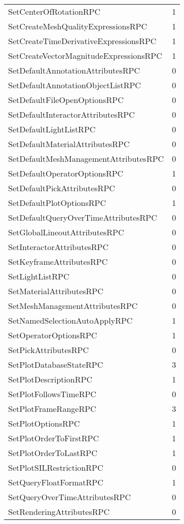 \documentclass[10pt,a4paper]{report}
\begin{document}
\begin{longtable}{ll}
SetCenterOfRotationRPC & 1 \\
SetCreateMeshQualityExpressionsRPC & 1 \\
SetCreateTimeDerivativeExpressionsRPC & 1 \\
SetCreateVectorMagnitudeExpressionsRPC & 1 \\
SetDefaultAnnotationAttributesRPC & 0 \\
SetDefaultAnnotationObjectListRPC & 0 \\
SetDefaultFileOpenOptionsRPC & 0 \\
SetDefaultInteractorAttributesRPC & 0 \\
SetDefaultLightListRPC & 0 \\
SetDefaultMaterialAttributesRPC & 0 \\
SetDefaultMeshManagementAttributesRPC & 0 \\
SetDefaultOperatorOptionsRPC & 1 \\
SetDefaultPickAttributesRPC & 0 \\
SetDefaultPlotOptionsRPC & 1 \\
SetDefaultQueryOverTimeAttributesRPC & 0 \\
SetGlobalLineoutAttributesRPC & 0 \\
SetInteractorAttributesRPC & 0 \\
SetKeyframeAttributesRPC & 0 \\
SetLightListRPC & 0 \\
SetMaterialAttributesRPC & 0 \\
SetMeshManagementAttributesRPC & 0 \\
SetNamedSelectionAutoApplyRPC & 1 \\
SetOperatorOptionsRPC & 1 \\
SetPickAttributesRPC & 0 \\
SetPlotDatabaseStateRPC & 3 \\
SetPlotDescriptionRPC & 1 \\
SetPlotFollowsTimeRPC & 0 \\
SetPlotFrameRangeRPC & 3 \\
SetPlotOptionsRPC & 1 \\
SetPlotOrderToFirstRPC & 1 \\
SetPlotOrderToLastRPC & 1 \\
SetPlotSILRestrictionRPC & 0 \\
SetQueryFloatFormatRPC & 1 \\
SetQueryOverTimeAttributesRPC & 0 \\
SetRenderingAttributesRPC & 0 \\

\end{longtable}
\end{document}
